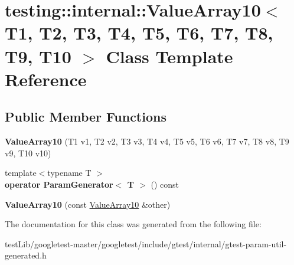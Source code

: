 \hypertarget{classtesting_1_1internal_1_1ValueArray10}{}\section{testing\+:\+:internal\+:\+:Value\+Array10$<$ T1, T2, T3, T4, T5, T6, T7, T8, T9, T10 $>$ Class Template Reference}
\label{classtesting_1_1internal_1_1ValueArray10}
\subsection*{Public Member Functions}
\begin{DoxyCompactItemize}
\item 
\mbox{\label{classtesting_1_1internal_1_1ValueArray10_a763527165bcd1d8e7c366f979b76736b}} 
{\bfseries Value\+Array10} (T1 v1, T2 v2, T3 v3, T4 v4, T5 v5, T6 v6, T7 v7, T8 v8, T9 v9, T10 v10)
\item 
\mbox{\label{classtesting_1_1internal_1_1ValueArray10_afa8855c713997ae82781159f3a3d53fc}} 
{\footnotesize template$<$typename T $>$ }\\{\bfseries operator Param\+Generator$<$ T $>$} () const
\item 
\mbox{\label{classtesting_1_1internal_1_1ValueArray10_a05195c20e50321e51b2502c71c5ec8fa}} 
{\bfseries Value\+Array10} (const \hyperlink{classtesting_1_1internal_1_1ValueArray10}{Value\+Array10} \&other)
\end{DoxyCompactItemize}


The documentation for this class was generated from the following file\+:\begin{DoxyCompactItemize}
\item 
test\+Lib/googletest-\/master/googletest/include/gtest/internal/gtest-\/param-\/util-\/generated.\+h\end{DoxyCompactItemize}
